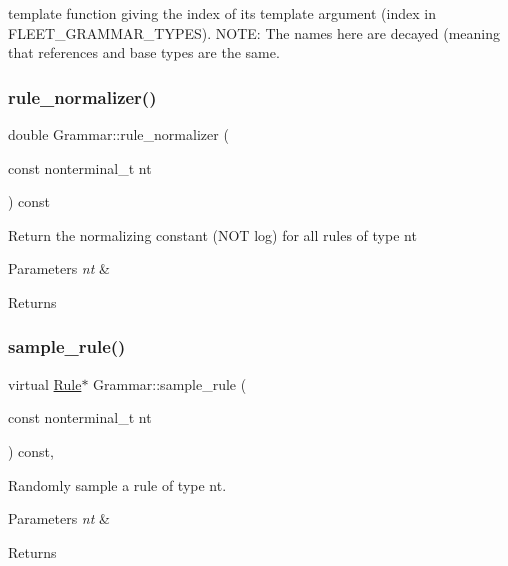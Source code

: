 template function giving the index of its template argument (index in F\+L\+E\+E\+T\+\_\+\+G\+R\+A\+M\+M\+A\+R\+\_\+\+T\+Y\+P\+ES). N\+O\+TE\+: The names here are decayed (meaning that references and base types are the same.\mbox{\label{class_grammar_a2182b3ded5171ba3e84be952176798e9}} 
\subsubsection{\texorpdfstring{rule\+\_\+normalizer()}{rule\_normalizer()}}
{\footnotesize\ttfamily double Grammar\+::rule\+\_\+normalizer (\begin{DoxyParamCaption}\item[{const nonterminal\+\_\+t}]{nt }\end{DoxyParamCaption}) const\hspace{0.3cm}{\ttfamily [inline]}}

Return the normalizing constant (N\+OT log) for all rules of type nt 
\begin{DoxyParams}{Parameters}
{\em nt} & \\
\hline
\end{DoxyParams}
\begin{DoxyReturn}{Returns}

\end{DoxyReturn}
\mbox{\label{class_grammar_a50c30e020e54743d5ede0ca9469fdb91}} 
\subsubsection{\texorpdfstring{sample\+\_\+rule()}{sample\_rule()}}
{\footnotesize\ttfamily virtual \hyperlink{class_rule}{Rule}$\ast$ Grammar\+::sample\+\_\+rule (\begin{DoxyParamCaption}\item[{const nonterminal\+\_\+t}]{nt }\end{DoxyParamCaption}) const\hspace{0.3cm}{\ttfamily [inline]}, {\ttfamily [virtual]}}

Randomly sample a rule of type nt. 
\begin{DoxyParams}{Parameters}
{\em nt} & \\
\hline
\end{DoxyParams}
\begin{DoxyReturn}{Returns}

\end{DoxyReturn}
\mbox{\label{class_grammar_aa3c730ea64c8ca5d93fecb4275f2e380}} 
